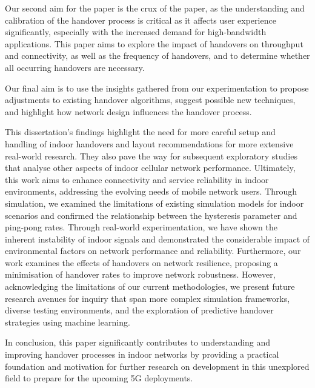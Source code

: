 Our second aim for the paper is the crux of the paper, as the understanding and calibration of the handover process is critical as it affects user experience significantly, especially with the increased demand for high-bandwidth applications. This paper aims to explore the impact of handovers on throughput and connectivity, as well as the frequency of handovers, and to determine whether all occurring handovers are necessary. 

Our final aim is to use the insights gathered from our experimentation to propose adjustments to existing handover algorithms, suggest possible new techniques, and highlight how network design influences the handover process. 

This dissertation’s findings highlight the need for more careful setup and handling of indoor handovers and layout recommendations for more extensive real-world research. They also pave the way for subsequent exploratory studies that analyse other aspects of indoor cellular network performance. Ultimately, this work aims to enhance connectivity and service reliability in indoor environments, addressing the evolving needs of mobile network users. Through simulation, we examined the limitations of existing simulation models for indoor scenarios and confirmed the relationship between the hysteresis parameter and ping-pong rates. Through real-world experimentation, we have shown the inherent instability of indoor signals and demonstrated the considerable impact of environmental factors on network performance and reliability. Furthermore, our work examines the effects of handovers on network resilience, proposing a minimisation of handover rates to improve network robustness. However, acknowledging the limitations of our current methodologies, we present future research avenues for inquiry that span more complex simulation frameworks, diverse testing environments, and the exploration of predictive handover strategies using machine learning. 

In conclusion, this paper significantly contributes to understanding and improving handover processes in indoor networks by providing a practical foundation and motivation for further research on development in this unexplored field to prepare for the upcoming 5G deployments. 
